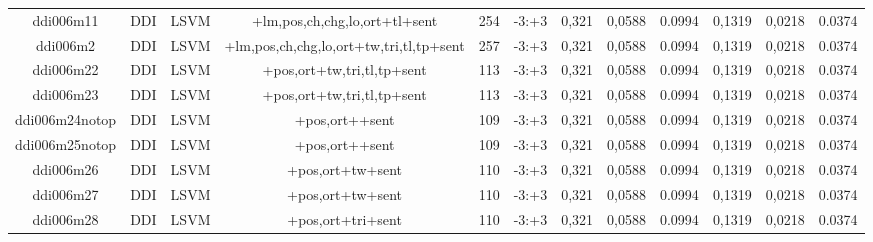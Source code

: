 \documentclass[a4paper]{article}
\begin{document}
\begin{landscape}
\begin{center}
\begin{tabular}{ |c|c|c|c|c|c|c|c|c|c|c|c|}
 	
 
 	
 		
 		\small{ ddi006m11 } & DDI & LSVM & +lm,pos,ch,chg,lo,ort+tl+sent  &  254 &  -3:+3  &  0,321 & 0,0588 & 0.0994  &  0,1319 & 0,0218 & 0.0374 \\
 		

 	
 
 	
 		
 		\small{ ddi006m2 } & DDI & LSVM & +lm,pos,ch,chg,lo,ort+tw,tri,tl,tp+sent  &  257 &  -3:+3  &  0,321 & 0,0588 & 0.0994  &  0,1319 & 0,0218 & 0.0374 \\
 		

 	
 
 	
 		
 		\small{ ddi006m22 } & DDI & LSVM & +pos,ort+tw,tri,tl,tp+sent  &  113 &  -3:+3  &  0,321 & 0,0588 & 0.0994  &  0,1319 & 0,0218 & 0.0374 \\
 		

 	
 
 	
 		
 		\small{ ddi006m23 } & DDI & LSVM & +pos,ort+tw,tri,tl,tp+sent  &  113 &  -3:+3  &  0,321 & 0,0588 & 0.0994  &  0,1319 & 0,0218 & 0.0374 \\
 		

 	
 
 	
 		
 		\small{ ddi006m24notop } & DDI & LSVM & +pos,ort++sent  &  109 &  -3:+3  &  0,321 & 0,0588 & 0.0994  &  0,1319 & 0,0218 & 0.0374 \\
 		

 	
 
 	
 		
 		\small{ ddi006m25notop } & DDI & LSVM & +pos,ort++sent  &  109 &  -3:+3  &  0,321 & 0,0588 & 0.0994  &  0,1319 & 0,0218 & 0.0374 \\
 		

 	
 
 	
 		
 		\small{ ddi006m26 } & DDI & LSVM & +pos,ort+tw+sent  &  110 &  -3:+3  &  0,321 & 0,0588 & 0.0994  &  0,1319 & 0,0218 & 0.0374 \\
 		

 	
 
 	
 		
 		\small{ ddi006m27 } & DDI & LSVM & +pos,ort+tw+sent  &  110 &  -3:+3  &  0,321 & 0,0588 & 0.0994  &  0,1319 & 0,0218 & 0.0374 \\
 		

 	
 
 	
 		
 		\small{ ddi006m28 } & DDI & LSVM & +pos,ort+tri+sent  &  110 &  -3:+3  &  0,321 & 0,0588 & 0.0994  &  0,1319 & 0,0218 & 0.0374 \\
 		


\end{tabular}
\end{center}
\end{landscape}
\end{document}
